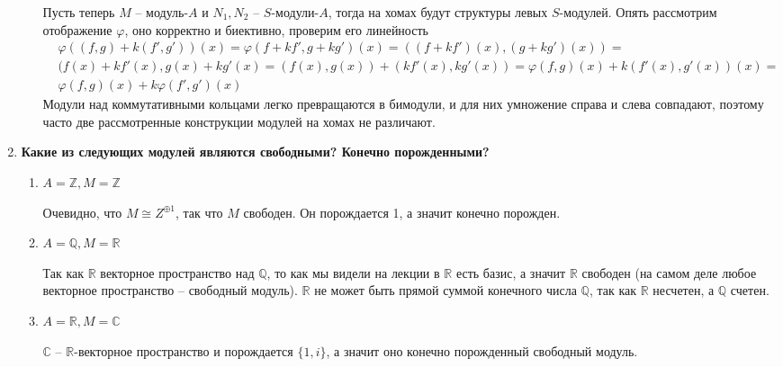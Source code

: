 \documentclass{article}
\begin{document}
\begin{enumerate}
\begin{enumerate}
                Пусть теперь $M$ – модуль-$A$ и $N_1,N_2$ – $S$-модули-$A$, тогда на хомах будут структуры левых
                $S$-модулей. Опять рассмотрим отображение $\varphi$, оно корректно и биективно, проверим его линейность
                \begin{align*}
                    &\varphi((f,g)+k(f',g'))(x)=\varphi(f+kf',g+kg')(x)=((f+kf')(x),(g+kg')(x))=\\
                    &(f(x)+kf'(x),g(x)+kg'(x)=(f(x),g(x))+(kf'(x),kg'(x))=\varphi(f,g)(x)+k(f'(x),g'(x))(x)=\\
                    &\varphi(f,g)(x)+k\varphi(f',g')(x)
                \end{align*}
                Модули над коммутативными кольцами легко превращаются в бимодули, и для них умножение
                справа и слева совпадают, поэтому часто две рассмотренные конструкции модулей на хомах не различают.
        \end{enumerate}
        
    \item \textbf{Какие из следующих модулей являются свободными? Конечно порожденными?}
        \begin{enumerate}
            \item $A = \mathbb{Z}, M = \mathbb{Z}$

                Очевидно, что $M\cong Z^{\oplus 1}$, так что $M$ свободен. Он порождается 1, а значит конечно порожден.

            \item $A=\mathbb{Q},M=\mathbb{R}$

                Так как $\mathbb{R}$ векторное пространство над $\mathbb{Q}$, то как мы видели на лекции в $\mathbb{R}$
                есть базис, а значит $\mathbb{R}$ свободен (на самом деле любое векторное пространство – свободный модуль).
                $\mathbb{R}$ не может быть прямой суммой конечного числа $\mathbb{Q}$, так как $\mathbb{R}$ несчетен, а
                $\mathbb{Q}$ счетен.

            \item $A = \mathbb{R}, M = \mathbb{C}$

                $\mathbb{C}$ – $\mathbb{R}$-векторное пространство и порождается $\{1,i\}$, а значит оно конечно порожденный
                свободный модуль.


\end{enumerate}
\end{enumerate}
\end{document}
